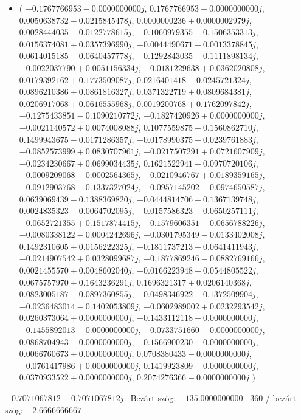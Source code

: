 \documentclass[14pt,a4paper]{article}
\begin{document}
\begin{itemize}
\item
$\big($
$-0.1767766953-0.0000000000j$, $0.1767766953+0.0000000000j$, $0.0050638732-0.0215845478j$, $0.0000000236+0.0000002979j$, $0.0028444035-0.0122778615j$, $-0.1060979355-0.1506353313j$, $0.0156374081+0.0357396990j$, $-0.0044490671-0.0013378845j$, $0.0614015185-0.0640457778j$, $-0.1292843035+0.1111898134j$, $-0.0022037790+0.0051156334j$, $-0.0181229638+0.0362020808j$, $0.0179392162+0.1773509087j$, $0.0216401418-0.0245721324j$, $0.0896210386+0.0861816327j$, $0.0371322719+0.0809684381j$, $0.0206917068+0.0616555968j$, $0.0019200768+0.1762097842j$, $-0.1275433851-0.1090210772j$, $-0.1827420926+0.0000000000j$, $-0.0021140572+0.0074008088j$, $0.1077559875-0.1560862710j$, $0.1499943675-0.0171286357j$, $-0.0178990375-0.0239761883j$, $-0.0852573999+0.0830707961j$, $-0.0217507291+0.0721607909j$, $-0.0234230667+0.0699034435j$, $0.1621522941+0.0970720106j$, $-0.0009209068-0.0002564365j$, $-0.0210946767+0.0189359165j$, $-0.0912903768-0.1337327024j$, $-0.0957145202-0.0974650587j$, $0.0639069439-0.1388369820j$, $-0.0444814706+0.1367139748j$, $0.0024835323-0.0064702095j$, $-0.0157586323+0.0650257111j$, $-0.0652721355+0.1517874415j$, $-0.1579606351-0.0656788226j$, $-0.0080338122-0.0004242696j$, $-0.0301795349-0.0133402008j$, $0.1492310605+0.0156222325j$, $-0.1811737213+0.0641411943j$, $-0.0214907542+0.0328099687j$, $-0.1877869246-0.0882769166j$, $0.0021455570+0.0048602040j$, $-0.0166223948-0.0544805522j$, $0.0675757970+0.1643236291j$, $0.1696321317+0.0206140368j$, $0.0823005187-0.0897360855j$, $-0.0498346922-0.1372509904j$, $-0.0236483014-0.1402053809j$, $-0.0602989002+0.0232293542j$, $0.0260373064+0.0000000000j$, $-0.1433112118+0.0000000000j$, $-0.1455892013-0.0000000000j$, $-0.0733751660-0.0000000000j$, $0.0868704943-0.0000000000j$, $-0.1566900230-0.0000000000j$, $0.0066760673+0.0000000000j$, $0.0708380433-0.0000000000j$, $-0.0761417986+0.0000000000j$, $0.1419923809+0.0000000000j$, $0.0370933522+0.0000000000j$, $0.2074276366-0.0000000000j$
$\big)$
\end{itemize}
$-0.7071067812-0.7071067812j$:\
Bezárt szög: $-135.0000000000$ \
360 / bezárt szög: $-2.6666666667$\
\end{document}
